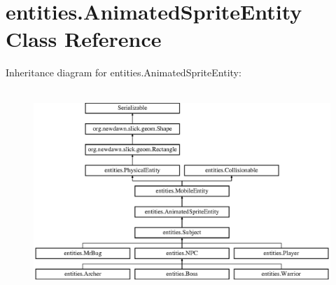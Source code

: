 \hypertarget{classentities_1_1_animated_sprite_entity}{}\section{entities.\+Animated\+Sprite\+Entity Class Reference}
\label{classentities_1_1_animated_sprite_entity}
Inheritance diagram for entities.\+Animated\+Sprite\+Entity\+:\begin{figure}[H]
\begin{center}
\leavevmode
\includegraphics[height=7.671233cm]{classentities_1_1_animated_sprite_entity}
\end{center}
\end{figure}
